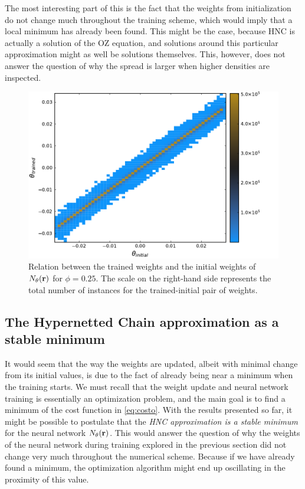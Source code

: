 The most interesting part of this is the fact that the weights from initialization
do not change much throughout the training scheme, which would imply that a local minimum
has already been found. This might be the case, because HNC is actually a solution of
the OZ equation, and solutions around this particular approximation might as well be
solutions themselves.
This, however, does not answer the question of why the spread is larger when
higher densities are inspected.

\begin{figure}[t]
    \includegraphics[width=\textwidth]{figuras/capitulo-3/weights_phi=0.25.pdf}
    \caption[Comparison between weights, $\phi=0.25$.]{Relation between the trained weights and the initial weights of $N_{\theta}(\mathbf{r})$ for $\phi=0.25$. The scale on the right-hand side represents the total number of instances for the trained-initial pair of weights.}
    \label{fig:pesos25}
\end{figure}

\subsection{The Hypernetted Chain approximation as a stable minimum}
It would seem that the way the weights are updated, albeit with minimal change from its
initial values, is due to the fact of already being near a minimum when the training starts.
We must recall that the weight update and neural network training is essentially an
optimization problem, and the main goal is to find a minimum
of the cost function in \autoref{eq:costo}. With the results presented so far, it might be
possible to postulate that the \emph{HNC approximation is a stable minimum} for the
neural network $N_{\theta}(\mathbf{r})$.
This would answer the question of why the weights of the neural network during training
explored in the previous section did not change very much throughout the numerical scheme.
Because if we have already found a minimum, the optimization algorithm might end up
oscillating in the proximity of this value.

